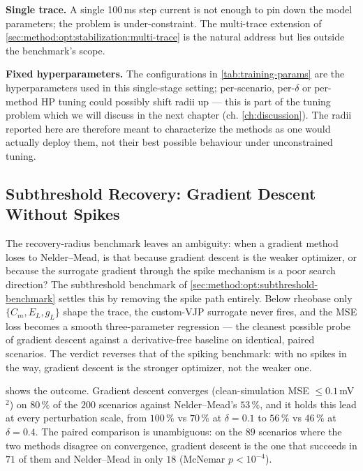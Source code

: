 \textbf{Single trace.} A single 100\,ms step current is not enough to pin down the model parameters;
the problem is under-constraint.
The multi-trace extension of \cref{sec:method:opt:stabilization:multi-trace} is the natural address but lies outside the benchmark's scope.

\textbf{Fixed hyperparameters.} The configurations in \cref{tab:training-params} are the hyperparameters used in this single-stage setting;
per-scenario, per-$\delta$ or per-method HP tuning could possibly shift radii up --- this is part of the tuning problem which we will discuss in the next chapter (ch. \ref{ch:discussion}).
The radii reported here are therefore meant to characterize the methods as one would actually deploy them, not their best possible behaviour under unconstrained tuning.

\subsection{Subthreshold Recovery: Gradient Descent Without Spikes}\label{sec:results:subthreshold}
The recovery-radius benchmark leaves an ambiguity: when a gradient method loses to Nelder--Mead, is that because gradient descent is the weaker optimizer, or because the surrogate gradient through the spike mechanism is a poor search direction?
The subthreshold benchmark of \cref{sec:method:opt:subthreshold-benchmark} settles this by removing the spike path entirely.
Below rheobase only $\{C_m, E_L, g_L\}$ shape the trace, the custom-VJP surrogate never fires, and the \gls{MSE} loss becomes a smooth three-parameter regression --- the cleanest possible probe of gradient descent against a derivative-free baseline on identical, paired scenarios.
The verdict reverses that of the spiking benchmark: with no spikes in the way, gradient descent is the stronger optimizer, not the weaker one.

 shows the outcome.
Gradient descent converges (clean-simulation \gls{MSE} $\leq 0.1$\,mV$^2$) on $80\,\%$ of the $200$ scenarios against Nelder--Mead's $53\,\%$, and it holds this lead at every perturbation scale, from $100\,\%$ vs $70\,\%$ at $\delta = 0.1$ to $56\,\%$ vs $46\,\%$ at $\delta = 0.4$.
The paired comparison is unambiguous: on the $89$ scenarios where the two methods disagree on convergence, gradient descent is the one that succeeds in $71$ of them and Nelder--Mead in only $18$ (McNemar $p < 10^{-4}$).

